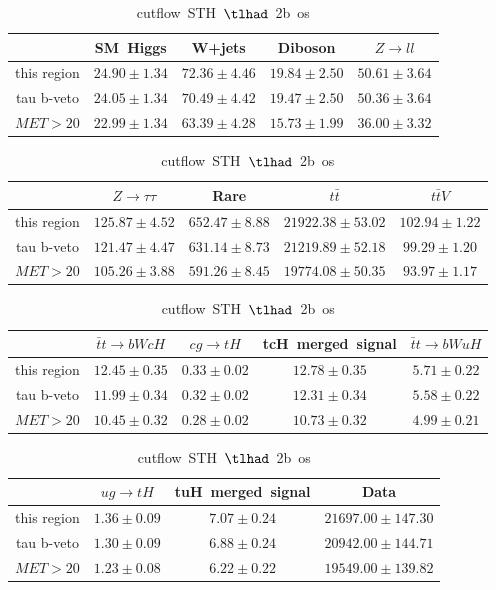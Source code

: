 \begin{table}
\caption{cutflow~STH~$\tlhad$~2b~os}
\centering
\begin{tabular}{|c|c|c|c|c|} \hline
 & SM~Higgs & W+jets & Diboson & $Z\to ll$\\\hline
this region & $24.90\pm1.34$ & $72.36\pm4.46$ & $19.84\pm2.50$ & $50.61\pm3.64$\\\hline
tau b-veto & $24.05\pm1.34$ & $70.49\pm4.42$ & $19.47\pm2.50$ & $50.36\pm3.64$\\\hline
$MET>20$ & $22.99\pm1.34$ & $63.39\pm4.28$ & $15.73\pm1.99$ & $36.00\pm3.32$\\\hline
\end{tabular}
\begin{tabular}{|c|c|c|c|c|} \hline
 & $Z\to \tau\tau$ & Rare & $t\bar{t}$ & $t\bar{t}V$\\\hline
this region & $125.87\pm4.52$ & $652.47\pm8.88$ & $21922.38\pm53.02$ & $102.94\pm1.22$\\\hline
tau b-veto & $121.47\pm4.47$ & $631.14\pm8.73$ & $21219.89\pm52.18$ & $99.29\pm1.20$\\\hline
$MET>20$ & $105.26\pm3.88$ & $591.26\pm8.45$ & $19774.08\pm50.35$ & $93.97\pm1.17$\\\hline
\end{tabular}
\begin{tabular}{|c|c|c|c|c|} \hline
 & $\bar{t}t\to bWcH$ & $cg\to tH$ & tcH~merged~signal & $\bar{t}t\to bWuH$\\\hline
this region & $12.45\pm0.35$ & $0.33\pm0.02$ & $12.78\pm0.35$ & $5.71\pm0.22$\\\hline
tau b-veto & $11.99\pm0.34$ & $0.32\pm0.02$ & $12.31\pm0.34$ & $5.58\pm0.22$\\\hline
$MET>20$ & $10.45\pm0.32$ & $0.28\pm0.02$ & $10.73\pm0.32$ & $4.99\pm0.21$\\\hline
\end{tabular}
\begin{tabular}{|c|c|c|c|} \hline
 & $ug\to tH$ & tuH~merged~signal & Data\\\hline
this region & $1.36\pm0.09$ & $7.07\pm0.24$ & $21697.00\pm147.30$\\\hline
tau b-veto & $1.30\pm0.09$ & $6.88\pm0.24$ & $20942.00\pm144.71$\\\hline
$MET>20$ & $1.23\pm0.08$ & $6.22\pm0.22$ & $19549.00\pm139.82$\\\hline
\end{tabular}
\label{tab:cutflow_reg1l1tau2b2j_os}
\end{table}

